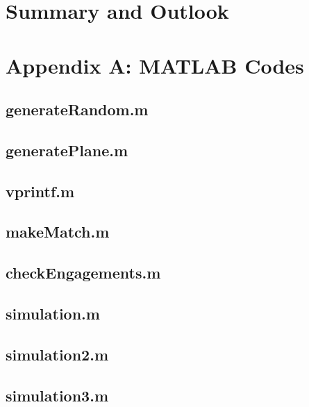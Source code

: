\documentclass[11pt]{article}
\begin{document}
\newpage
\section{Summary and Outlook}

\renewcommand{\refname}{\section{References}}





\section{Appendix A: MATLAB Codes}

\subsection*{generateRandom.m}

\subsection*{generatePlane.m}

\subsection*{vprintf.m}

\subsection*{makeMatch.m}

\subsection*{checkEngagements.m}

\subsection*{simulation.m}

\subsection*{simulation2.m}

\subsection*{simulation3.m}

\end{document}
